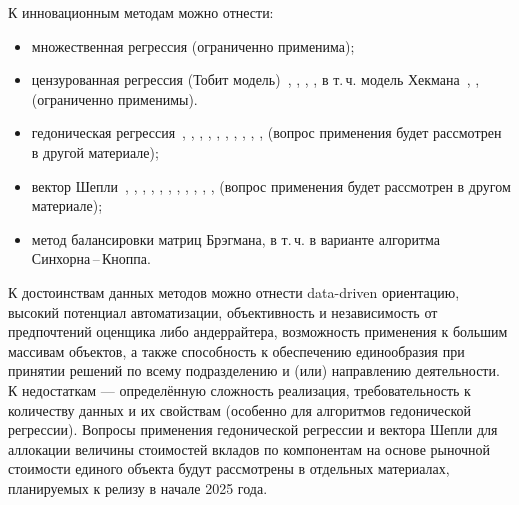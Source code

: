 \documentclass[12pt]{scrartcl}
\begin{document}
К инновационным методам можно отнести:
\begin{itemize}
    \item множественная регрессия (ограниченно применима);
    \item цензурованная регрессия (Тобит модель)~\cite{RTobit}, \cite{Breen2003}, \cite{Buchinsky1998}, \cite{Lewbel2002}, в т.\,ч. модель Хекмана~\cite{Winship1992}, \cite{Heckman1974}, \cite{Heckman1976}  (ограниченно применимы).
    \item гедоническая регрессия~\cite{Rosen1974}, \cite{Court1939}, \cite{Chanel1996}, \cite{Pakko2020}, \cite{Malpezzi2002}, \cite{Sirmans2005}, \cite{Bourassa2006}, \cite{Goodman1998}, \cite{Kestens2006}, \cite{Tochaiwat2019}, \cite{BurhaidaBurhan2013} (вопрос применения будет рассмотрен в другой материале);
    \item вектор Шепли~\cite{Shapley1953}, \cite{Neuman1944}, \cite{Osborne1994}, \cite{Yu2004}, \cite{Roth2005}, \cite{Peleg2007}, \cite{Winter_2002}, \cite{Young1995}, \cite{Harsanyi_1982}, \cite{Kenton2024}, \cite{OpenJS2023}, \cite{Meadows2004} (вопрос применения будет рассмотрен в другом материале);
    \item метод балансировки матриц Брэгмана, в т.\,ч. в варианте алгоритма Синхорна\,--\,Кноппа.
\end{itemize}
К достоинствам данных методов можно отнести data-driven ориентацию, высокий потенциал автоматизации, объективность и независимость от предпочтений оценщика либо андеррайтера, возможность применения к большим массивам объектов, а также способность к обеспечению единообразия при принятии решений по всему подразделению и (или) направлению деятельности. К недостаткам --- определённую сложность реализация, требовательность к количеству данных и их свойствам (особенно для алгоритмов гедонической регрессии). Вопросы применения гедонической регрессии и вектора Шепли для аллокации величины стоимостей вкладов по компонентам на основе рыночной стоимости единого объекта будут рассмотрены в отдельных материалах, планируемых к релизу в начале 2025 года.
\end{document}
